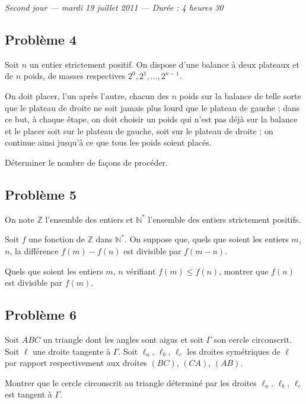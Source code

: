\bigskip
\begin{center}
  \emph{Second jour --- mardi 19 juillet 2011 --- Durée : 4 heures 30}
\end{center}

\subsection*{Problème 4}
Soit $n$ un entier strictement positif. On dispose d'une balance à deux plateaux et de $n$ poids, de masses
respectives $2^0, 2^1, \ldots, 2^{n-1}$.

On doit placer, l'un après l'autre, chacun des $n$ poids sur la balance de telle sorte que le plateau de
droite ne soit jamais plus lourd que le plateau de gauche ; dans ce but, à chaque étape, on doit choisir un
poids qui n'est pas déjà sur la balance et le placer soit sur le plateau de gauche, soit sur le plateau de
droite ; on continue ainsi jusqu'à ce que tous les poids soient placés.

Déterminer le nombre de façons de procéder.

\subsection*{Problème 5}
On note $\mathbb{Z}$ l'ensemble des entiers et $\mathbb{N}^*$ l'ensemble des entiers strictement positifs.

Soit $f$ une fonction de $\mathbb{Z}$ dans $\mathbb{N}^*$. On suppose que, quels que soient les entiers $m$,
$n$, la différence $f(m) - f(n)$ est divisible par $f(m - n)$.

Quels que soient les entiers $m$, $n$ vérifiant $f(m) \leqslant f(n)$, montrer que $f(n)$ est divisible par
$f(m)$.

\subsection*{Problème 6}
Soit $ABC$ un triangle dont les angles sont aigus et soit $\Gamma$ son cercle circonscrit. Soit $\ell$ une
droite tangente à $\Gamma$. Soit $\ell_a$, $\ell_b$, $\ell_c$ les droites symétriques de $\ell$ par rapport
respectivement aux droites $(BC)$, $(CA)$, $(AB)$.

Montrer que le cercle circonscrit au triangle déterminé par les droites $\ell_a$, $\ell_b$, $\ell_c$ est
tangent à $\Gamma$.
